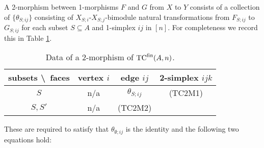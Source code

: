 \documentclass{amsart}
\begin{document}
\begin{list}{(TC1M)}{}
\begin{figure}[ht]
\begin{center}
		\end{center}
		\label{fig:EqnSSSijMorphism}
	\end{figure}
\end{list}
A 2-morphism between 1-morphisms $F$ and $G$ from $X$ to $Y$ consists of a collection of $\{ \theta_{S;ij} \}$ consisting of $X_{S;i}$-$X_{S;j}$-bimodule natural transformations from $F_{S;ij}$ to $G_{S;ij}$ for each subset $S \subseteq A$ and 1-simplex $ij$ in $[n]$. For completeness we record this in Table \ref{Table:2MorOfTC}.
\begin{table}[h]
	\caption{Data of a 2-morphism of ${\mathrm{TC}^{\text{fin}}}(A,n)$.}
	\begin{tabular}{c |ccc}
	 subsets \textbackslash\ faces & vertex $i$ & edge $ij$ & 2-simplex $ijk$   \\
	\hline
	$S$ 				& n/a & $\theta_{S; ij}$ &     (TC2M1) \\
	$S, S'$ 			& n/a &  (TC2M2)  &    \\
	\end{tabular}
%	
%	
	\label{Table:2MorOfTC}
\end{table}
These are required to satisfy that $\theta_{\emptyset;ij}$ is the identity and the following two equations hold:
\end{document}
